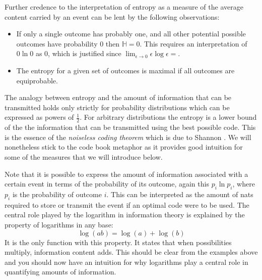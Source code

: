 Further credence to the interpretation of entropy as a measure of the average content carried by an event can be lent by the following observations:
\begin{itemize}
\item  If only a single outcome has probably one, and all other potential possible outcomes have probability 0 then
  $\mathbb{H} = 0$. This requires an interpretation of $0 \ln 0$ as 0, which is justified since $\lim_{\epsilon \rightarrow 0} \epsilon \log \epsilon = $.
\item The entropy for a given set of outcomes is maximal if all outcomes are equiprobable. 
\end{itemize}
The analogy  between entropy and the amount of information that can be transmitted holds only strictly
for probability distributions which can be expressed as powers of $\frac{1}{2}$. For arbitrary
distributions  the entropy is a lower bound of the the information that can be transmitted using the best possible code. This is the essence of the \emph{noiseless
  coding theorem} which is due to Shannon \cite{bishop2006}. We will nonetheless stick to the code book metaphor as it provides good intuition for some of the
measures that we will introduce below.


Note that it is possible to express the amount of information associated with a certain event in terms of the probability of its outcome, again this $p_i \ln p_i$, where
$p_i$ is the probability of outcome $i$. This can be interpreted as the amount of nats required to store or transmit the event if an optimal code were to be used.
The central role played by the logarithm in information theory is explained by the property of logarithms in any base:
$$
\log(ab) = \log(a) + \log(b)
$$
It is the only function with this property. It states that when possibilities multiply, information content adds. This should be clear from the examples above and you
should now have an intuition for why logarithms play a central role in quantifying amounts of information.



